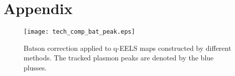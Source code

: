 \section*{Appendix}

\begin{figure}[h!]
    \centering
    \texttt{[image: tech\_comp\_bat\_peak.eps]}\caption{Batson correction applied to q-EELS maps constructed by different methods. The tracked plasmon peaks are denoted by the blue plusses.}
    \label{fig:bat-cor-comp}
\end{figure}